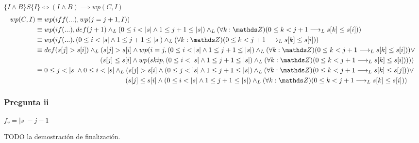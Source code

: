 $ \{ I \wedge B \} S \{ I \} \iff (I \wedge B) \implies wp(C, I) $
\begin{align*}
    wp(C, I) &\equiv wp(iff(...), wp(j=j+1, I)) \\
    &\equiv wp(if(...), def(j+1) \yLuego (0 \leq i < |s| \wedge 1 \leq j+1 \leq |s|) \yLuego (\forall k: \ent)(0 \leq k < j+1 \implicaLuego s[k] \leq s[i])) \\
    &\equiv wp(if(...), (0 \leq i < |s| \wedge 1 \leq j+1 \leq |s|) \yLuego (\forall k: \ent)(0 \leq k < j+1 \implicaLuego s[k] \leq s[i])) \\
    &\equiv def(s[j] > s[i]) \yLuego (s[j] > s[i] \wedge wp(i = j, (0 \leq i < |s| \wedge 1 \leq j+1 \leq |s|) \yLuego (\forall k: \ent)(0 \leq k < j+1 \implicaLuego s[k] \leq s[i])) \vee \\
    &\qquad \qquad \qquad \qquad \quad \; \; (s[j] \leq s[i] \wedge wp(skip, (0 \leq i < |s| \wedge 1 \leq j+1 \leq |s|) \yLuego (\forall k: \ent)(0 \leq k < j+1 \implicaLuego s[k] \leq s[i])))) \\
    &\equiv 0 \leq j < |s| \wedge 0 \leq i < |s| \yLuego (s[j] > s[i] \wedge (0 \leq j < |s| \wedge 1 \leq j+1 \leq |s|) \yLuego (\forall k: \ent)(0 \leq k < j+1 \implicaLuego s[k] \leq s[j])) \vee \\
    &\qquad \qquad \qquad \qquad \qquad \qquad \quad \; (s[j] \leq s[i] \wedge (0 \leq i < |s| \wedge 1 \leq j+1 \leq |s|) \yLuego (\forall k: \ent)(0 \leq k < j+1 \implicaLuego s[k] \leq s[i])) \\
\end{align*}

\subsubsection{Pregunta ii}

$ f_v = |s| - j -1 $

TODO la demostración de finalización.

